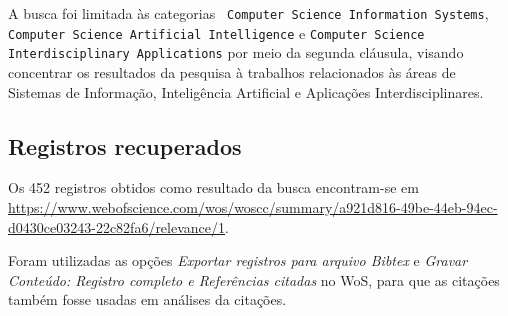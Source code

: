A busca foi limitada às categorias \texttt{ Computer Science Information Systems}, \texttt{ Computer Science Artificial Intelligence} e \texttt{Computer Science Interdisciplinary Applications} por meio da segunda cláusula, visando concentrar os resultados da pesquisa à trabalhos relacionados às áreas de Sistemas de Informação, Inteligência Artificial e Aplicações Interdisciplinares. 

\subsection{Registros recuperados}

Os 452 registros obtidos como resultado da busca encontram-se em \url{https://www.webofscience.com/wos/woscc/summary/a921d816-49be-44eb-94ec-d0430ce03243-22c82fa6/relevance/1}. 

Foram utilizadas as opções \textit{Exportar registros para arquivo Bibtex} e \textit{Gravar Conteúdo: Registro completo e Referências citadas} no WoS, para que as citações também fosse usadas em análises da citações.

